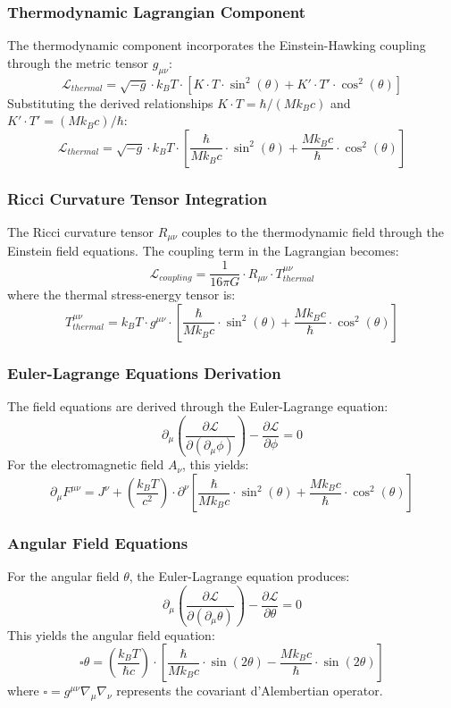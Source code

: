 ﻿\documentclass[12pt]{article}
\begin{document}
\subsubsection{Thermodynamic Lagrangian Component}
The thermodynamic component incorporates the Einstein-Hawking coupling through the metric tensor $g_{\mu\nu}$:
$$\mathcal{L}_{thermal} = \sqrt{-g} \cdot k_B T \cdot \left[K\cdot T\cdot\sin^2(\theta) + K'\cdot T'\cdot\cos^2(\theta)\right]$$
Substituting the derived relationships $K\cdot T = \hbar/(Mk_Bc)$ and $K'\cdot T' = (Mk_Bc)/\hbar$:
$$\mathcal{L}_{thermal} = \sqrt{-g} \cdot k_B T \cdot \left[\frac{\hbar}{Mk_Bc}\cdot\sin^2(\theta) + \frac{Mk_Bc}{\hbar}\cdot\cos^2(\theta)\right]$$

\subsubsection{Ricci Curvature Tensor Integration}
The Ricci curvature tensor $R_{\mu\nu}$ couples to the thermodynamic field through the Einstein field equations. The coupling term in the Lagrangian becomes:
$$\mathcal{L}_{coupling} = \frac{1}{16\pi G} \cdot R_{\mu\nu} \cdot T^{\mu\nu}_{thermal}$$
where the thermal stress-energy tensor is:
$$T^{\mu\nu}_{thermal} = k_B T \cdot g^{\mu\nu} \cdot \left[\frac{\hbar}{Mk_Bc}\cdot\sin^2(\theta) + \frac{Mk_Bc}{\hbar}\cdot\cos^2(\theta)\right]$$

\subsubsection{Euler-Lagrange Equations Derivation}
The field equations are derived through the Euler-Lagrange equation:
$$\partial_\mu\left(\frac{\partial\mathcal{L}}{\partial(\partial_\mu\phi)}\right) - \frac{\partial\mathcal{L}}{\partial\phi} = 0$$
For the electromagnetic field $A_\nu$, this yields:
$$\partial_\mu F^{\mu\nu} = J^\nu + \left(\frac{k_B T}{c^2}\right) \cdot \partial^\nu\left[\frac{\hbar}{Mk_Bc}\cdot\sin^2(\theta) + \frac{Mk_Bc}{\hbar}\cdot\cos^2(\theta)\right]$$

\subsubsection{Angular Field Equations}
For the angular field $\theta$, the Euler-Lagrange equation produces:
$$\partial_\mu\left(\frac{\partial\mathcal{L}}{\partial(\partial_\mu\theta)}\right) - \frac{\partial\mathcal{L}}{\partial\theta} = 0$$
This yields the angular field equation:
$$\square\theta = \left(\frac{k_B T}{\hbar c}\right) \cdot \left[\frac{\hbar}{Mk_Bc}\cdot\sin(2\theta) - \frac{Mk_Bc}{\hbar}\cdot\sin(2\theta)\right]$$
where $\square = g^{\mu\nu}\nabla_\mu\nabla_\nu$ represents the covariant d'Alembertian operator.
\end{document}
